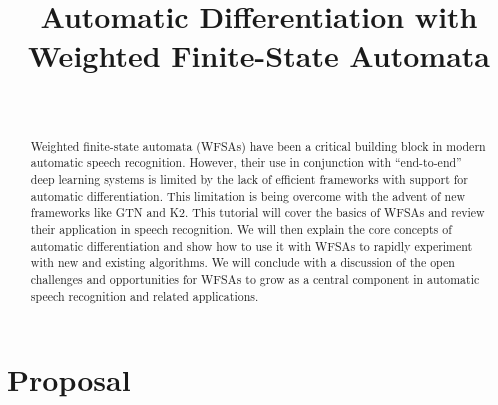 \documentclass[11pt]{article}
\title{Automatic Differentiation with Weighted Finite-State Automata}
\author{
 
  \\
 
}
\begin{document}
\maketitle

\begin{abstract}
  Weighted finite-state automata (WFSAs) have been a critical building block in
  modern automatic speech recognition. However, their use in conjunction with
  ``end-to-end'' deep learning systems is limited by the lack of efficient
  frameworks with support for automatic differentiation. This limitation is
  being overcome with the advent of new frameworks like GTN and K2. This
  tutorial will cover the basics of WFSAs and review their application in
  speech recognition. We will then explain the core concepts of automatic
  differentiation and show how to use it with WFSAs to rapidly experiment with
  new and existing algorithms. We will conclude with a discussion of the open
  challenges and opportunities for WFSAs to grow as a central component in
  automatic speech recognition and related applications.
\end{abstract}

\section*{Proposal}
\end{document}
